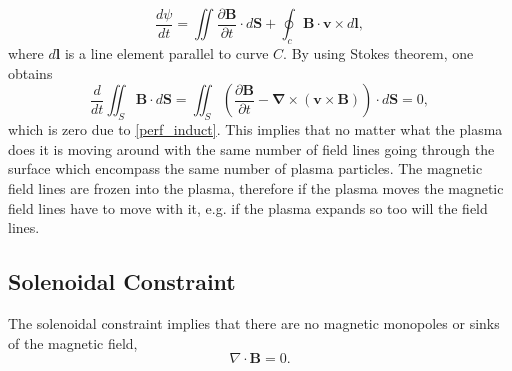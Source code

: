 \documentclass[12pt]{ociamthesis}
\newcommand{\bs}[1]{\boldsymbol{#1}}
\newcommand{\bn}{\boldsymbol{\nabla}}
\begin{document}
\begin{equation}
    \frac{d \psi}{ dt} = \iint \frac{\partial \bs{B}}{ \partial t} \cdot d\bs{S} + \oint_c  \bs{B} \cdot \bs{v} \times d\bs{l},
\end{equation}
where $d\bs{l}$ is a line element parallel to curve $C$. By using Stokes theorem, one obtains
\begin{equation}
    \frac{d}{dt} \iint_S \bs{B} \cdot d \bs{S} = \iint_S \left( \frac{\partial \boldsymbol{B}}{\partial t} - \bn \times (\boldsymbol{v} \times \boldsymbol{B})  \right) \cdot d\bs{S} = 0, 
\end{equation}
which is zero due to \eqref{perf_induct}. This implies that no matter what the plasma does it is moving around with the same number of field lines going through the surface which encompass the same number of plasma particles. The magnetic field lines are frozen into the plasma, therefore if the plasma moves the magnetic field lines have to move with it, e.g. if the plasma expands so too will the field lines.
\subsection{Solenoidal Constraint}
\label{section:cont_eq}
The solenoidal constraint implies that there are no magnetic monopoles or sinks of the magnetic field,
\begin{equation}\label{eq90}
\nabla \cdot \boldsymbol{B} = 0.
\end{equation}
\end{document}
